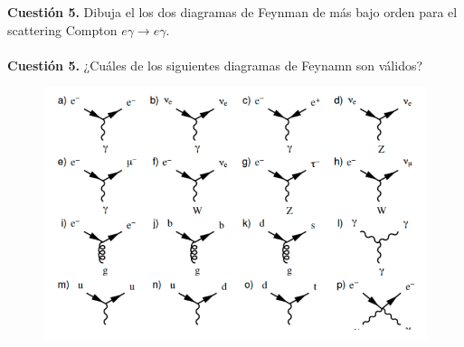 \documentclass[paper=a4, fontsize=11pt]{scrartcl} %
\numberwithin{equation}{section} %
\numberwithin{figure}{section} %
\numberwithin{table}{section} %
\begin{document}
\textbf{Cuestión 5.} Dibuja el los dos diagramas de Feynman de más bajo orden para el scattering Compton $e\gamma\rightarrow e\gamma$.
\\
\\
\textbf{Cuestión 5.} ¿Cuáles de los siguientes diagramas de Feynamn son válidos?
  

\begin{figure}[!h]
\begin{center}
\includegraphics[width=0.6\linewidth]{feynman.png}
\end{center}
\end{figure}
\end{document}
